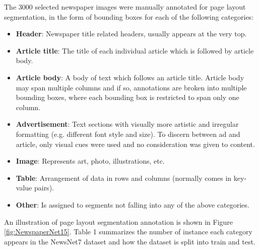 \documentclass[letterpaper]{article} %
\begin{document}
The 3000 selected newspaper images were manually annotated for page layout segmentation, in the form of bounding boxes for each of the following categories:
\begin{itemize}
    \item \textbf{Header}: Newspaper title related headers, usually appears at the very top.
    \item \textbf{Article title}: The title of each individual article which is followed by article body. 
    \item \textbf{Article body}: A body of text which follows an article title. Article body may span multiple columns and if so, annotations are broken into multiple bounding boxes, where each bounding box is restricted to span only one column.
    \item \textbf{Advertisement}: Text sections with visually more artistic and irregular formatting (e.g. different font style and size). To discern between ad and article, only visual cues were used and no consideration was given to content.
    \item \textbf{Image}: Represents art, photo, illustrations, etc.
    \item \textbf{Table}: Arrangement of data in rows and columns (normally comes in key-value pairs). 
    \item \textbf{Other}: Is assigned to segments not falling into any of the above categories.
\end{itemize}

An illustration of page layout segmentation annotation is shown in Figure \ref{fig:NewspaperNet15}.
Table 1 summarizes the number of instance each category appears in the NewsNet7 dataset and how the dataset is split into train and test.

\end{document}
